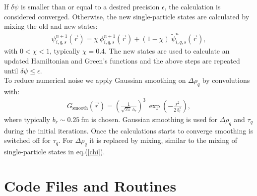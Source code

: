 \documentclass[4p]{elsarticle}
\begin{document}
If $\delta \psi$ is smaller than or equal to a desired precision $\epsilon$, the calculation is considered converged. Otherwise, the new single-particle states are calculated by mixing the old and new states: 
\begin{align}
\psi_{i,q,s}^{n+1} (\vec{r}) = \chi \: \phi_{i,q,s}^{n+1} (\vec{r})+ (1 - \chi) \: \tilde{\psi}_{i,q,s}^{n} (\vec{r}), 
\label{chi}
\end{align} 
with $0 < \chi < 1$, typically $\chi = 0.4$. The new states are used to calculate an updated Hamiltonian and Green's functions and the above steps are repeated until $\delta \psi \leq \epsilon$.\\
To reduce numerical noise we apply Gaussian smoothing on $\Delta \rho_q$ by convolutions with:
\begin{align}
G_\mathrm{smooth} (\vec{r}) = \left( \frac{1}{\sqrt{2 \pi} \: b_r} \right)^{3} \: \exp\left(-\frac{r^2}{2 \: b_{r}^2}\right), 
\end{align}
where typically $b_{r} \sim 0.25\:$fm is chosen. Gaussian smoothing is used for $\Delta \rho_q$ and $\tau_q$ during the initial iterations. Once the calculations starts to converge smoothing is switched off for $\tau_q$. For $\Delta \rho_q$ it is replaced by mixing, similar to the mixing of single-particle states in eq.(\ref{chi}). 
\section{Code Files and Routines}
\end{document}
